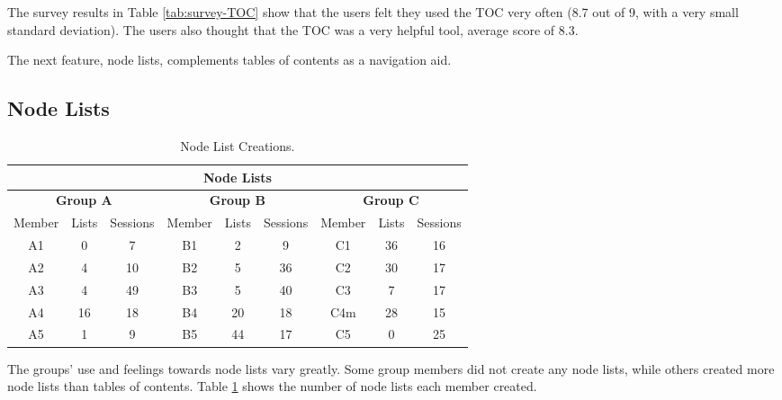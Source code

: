 The survey results in Table \ref{tab:survey-TOC} show that the users felt
they used the TOC very often (8.7 out of 9, with a very small standard
deviation).  The users also thought that the TOC was a very helpful tool,
average score of 8.3.  

The next feature, node lists, complements tables of contents as a navigation
aid.

\newpage
\subsection{Node Lists}

\footnotesize
\begin{table}[htb]
  \caption{Node List Creations.}
  \begin{center}
    \begin{tabular}{|c|c|c||c|c|c||c|c|c|}
      \hline
      \multicolumn{9}{|c|}{\rule[-3mm]{0mm}{8mm}\bf Node Lists}\\
      \hline
      \multicolumn{3}{|c||}{\rule[-3mm]{0mm}{8mm}\bf Group A}&
      \multicolumn{3}{|c||}{\rule[-3mm]{0mm}{8mm}\bf Group B}&
      \multicolumn{3}{|c|}{\rule[-3mm]{0mm}{8mm}\bf Group C}\\ \hline
      Member&Lists&Sessions&Member&Lists&Sessions&Member&Lists&Sessions\\ \hline
      \hline
      A1&0&7&B1&2&9&C1&36&16\\\hline 
      A2&4&10&B2&5&36&C2&30&17\\ \hline
      A3&4&49&B3&5&40&C3&7&17\\ \hline
      A4&16&18&B4&20&18&C4m&28&15\\ \hline
      A5&1&9&B5&44&17&C5&0&25\\\hline
    \end{tabular}
  \end{center}
  \label{tab:A-Node List}
\end{table}
\normalsize

The groups' use and feelings towards node lists vary greatly.  Some group
members did not create any node lists, while others created more node lists
than tables of contents.  Table \ref{tab:A-Node List} shows the number of
node lists each member created.


